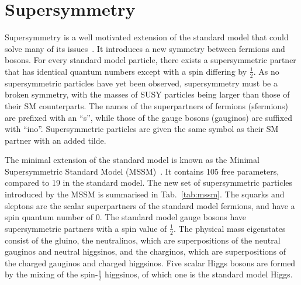 \section{Supersymmetry}
\label{sec:theory-susy}
Supersymmetry is a well motivated extension of the standard model that 
could solve many of its issues~\cite{susy-primer}. It introduces a new symmetry 
between fermions 
and bosons. For every standard model particle, there exists a supersymmetric 
partner that has identical quantum numbers except with a spin differing by 
$\frac{1}{2}$. As no supersymmetric particles have yet been observed, 
supersymmetry must be a broken symmetry, with the masses of SUSY particles 
being larger than those of their SM counterparts. The names of the 
superpartners of fermions (sfermions) are prefixed with an ``s'', while those 
of the gauge bosons (gauginos) are suffixed with ``ino''. Supersymmetric 
particles are given the same symbol as their SM partner with an added tilde.

The minimal extension of the standard model is known as the Minimal 
Supersymmetric Standard Model (MSSM)~\cite{mssm}. It contains 105 free 
parameters, compared to 19 in the standard model.
The new set of supersymmetric particles introduced by the MSSM is summarised in 
Tab.~\ref{tab:mssm}. The squarks and sleptons are the scalar superpartners of 
the standard model fermions, and have a spin quantum number of 0. The standard 
model gauge bosons have supersymmetric partners with a spin value of 
$\frac{1}{2}$. The physical mass eigenstates consist of the gluino, the 
neutralinos, which are superpositions of the neutral gauginos and neutral 
higgsinos, and the charginos, which are superpositions of the charged gauginos 
and charged higgsinos. Five scalar Higgs bosons are formed by the mixing of the 
{spin-$\frac{1}{2}$} higgsinos, of which one is the standard model Higgs.


